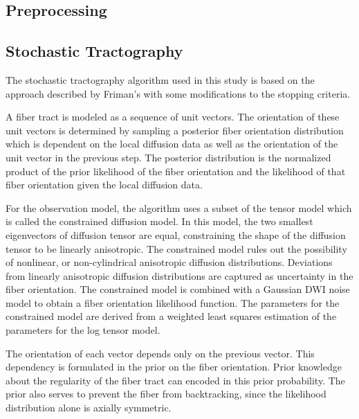 \documentclass{article}
\begin{document}
\subsection{Preprocessing}

\subsection{Stochastic Tractography}
The stochastic tractography algorithm used in this study is based on the approach described by Friman's \cite{frimanTMI06} with some modifications to the stopping criteria.

A fiber tract is modeled as a sequence of unit vectors.  The orientation of these unit vectors is determined by sampling a posterior fiber orientation distribution which is dependent on the local diffusion data as well as the orientation of the unit vector in the previous step.  The posterior distribution is the normalized product of the prior likelihood of the fiber orientation and the likelihood of that fiber orientation given the local diffusion data.

For the observation model, the algorithm uses a subset of the tensor model which is called the constrained diffusion model.  In this model, the two smallest eigenvectors of diffusion tensor are equal, constraining the shape of the diffusion tensor to be linearly anisotropic.  The constrained model rules out the possibility of nonlinear, or non-cylindrical anisotropic diffusion distributions.  Deviations from linearly anisotropic diffusion distributions are captured as uncertainty in the fiber orientation.  The constrained model is combined with a Gaussian DWI noise model to obtain a fiber orientation likelihood function.  The parameters for the constrained model are derived from a weighted least squares estimation of the parameters for the log tensor model.

The orientation of each vector depends only on the previous vector.  This dependency is formulated in the prior on the fiber orientation.  Prior knowledge about the regularity of the fiber tract can encoded in this prior probability.  The prior also serves to prevent the fiber from backtracking, since the likelihood distribution alone is axially symmetric.
\end{document}

